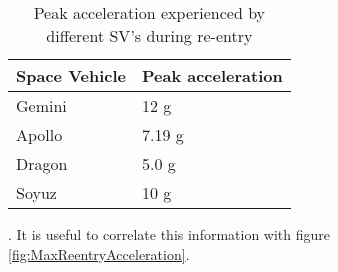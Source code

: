 \begin{table}[!htb]
\centering
\begin{tabular}{|l|l|}
\hline
\rowcolor[HTML]{C0C0C0} 
Space Vehicle & Peak acceleration                    \\ \hline
Gemini        & 12 g \cite{FAA}                      \\ \hline
\rowcolor[HTML]{EFEFEF} 
Apollo        & 7.19 g \cite{johnston1975biomedical} \\ \hline
Dragon        & 5.0 g \cite{trevino2008spacex}       \\ \hline
\rowcolor[HTML]{EFEFEF} 
Soyuz         & 10 g \cite{ReentryDynamics}          \\ \hline
\end{tabular}
\caption{Peak acceleration experienced by different \ac{SV}'s during re-entry}. It is useful to correlate this information with figure \ref{fig:MaxReentryAcceleration}.
\label{ReEntryTable}
\end{table}